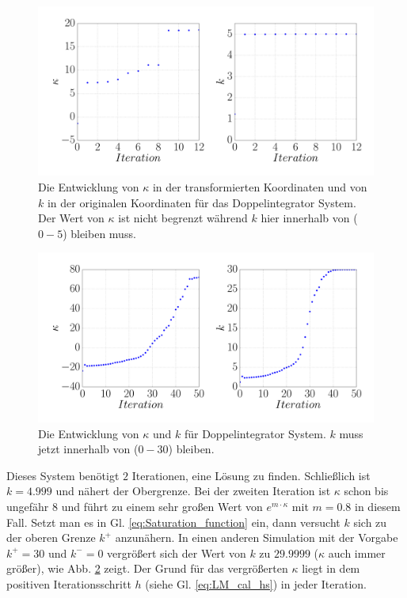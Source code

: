 \begin{figure}[!h]
	\centering
	\includegraphics[width=0.7\linewidth]{bild/30_32/test0_mit_k_con_sk_5.pdf}
	\caption[Die Entwicklung von $\kappa$ in der transformierten Koordinaten und von $k$ in der originalen Koordinaten für das Doppelintegrator System.]{Die Entwicklung von $\kappa$ in der transformierten Koordinaten und von $k$ in der originalen Koordinaten für das Doppelintegrator System. Der Wert von $\kappa$ ist nicht begrenzt während $k$ hier innerhalb von ($0-5$) bleiben muss.}
	\label{fig:Doppelintegrator_mit_k_constrain_sk_5}
\end{figure}
\begin{figure}[!h]
	\centering
	\includegraphics[width=0.7\linewidth]{bild/30_32/test0_mit_k_con_sk_30.pdf}%
	\caption[Die Entwicklung von $\kappa$ und $k$ für Doppelintegrator System.]{Die Entwicklung von $\kappa$ und $k$ für Doppelintegrator System. $k$ muss jetzt innerhalb von ($0-30$) bleiben.}
	\label{fig:Doppelintegrator_mit_k_constrain_sk_30}
\end{figure}
Dieses System benötigt $2$ Iterationen, eine Lösung zu finden. Schließlich ist $k=4.999$ und nähert der Obergrenze. Bei der zweiten Iteration ist $\kappa$ schon bis ungefähr $8$ und führt zu einem sehr großen Wert von $e^{m\cdot \kappa}$ mit $m=0.8$ in diesem Fall. Setzt man es in Gl. \eqref{eq:Saturation_function} ein, dann versucht $k$ sich zu der oberen Grenze $k^{+}$ anzunähern. In einen anderen Simulation mit der Vorgabe $k^{+}=30$ und $k^{-}=0$ vergrößert sich der Wert von $k$ zu $29.9999$ ($\kappa$ auch immer größer), wie Abb. \ref{fig:Doppelintegrator_mit_k_constrain_sk_30} zeigt. Der Grund für das vergrößerten $\kappa$ liegt in dem positiven Iterationsschritt $h$ (siehe Gl. \eqref{eq:LM_cal_hs}) in jeder Iteration.


